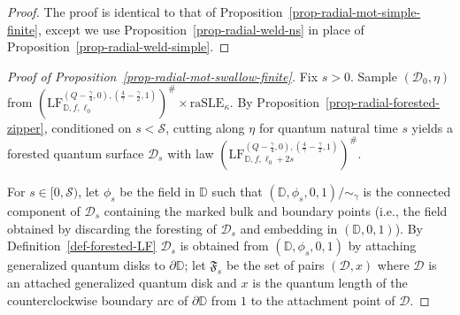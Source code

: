 \documentclass[a4paper]{article}
\numberwithin{equation}{section}
\newcommand{\bbD}{\mathbb{D}}
\newcommand{\D}{\mathbb{D}}
\newcommand{\cD}{\mathcal{D}}
\newcommand{\qduration}{\mathcal{S}}
\newcommand{\LF}{\mathrm{LF}}
\theoremstyle{remark}
\numberwithin{equation}{section}
\begin{document}
\begin{proof}
The proof is identical to that of Proposition~\ref{prop-radial-mot-simple-finite}, except we use Proposition~\ref{prop-radial-weld-ns} in place of Proposition~\ref{prop-radial-weld-simple}.  
\end{proof}

    
\begin{proof}[{Proof of Proposition~\ref{prop-radial-mot-swallow-finite}}]
Fix $s >0$. Sample $(\cD_0, \eta)$ from $ (\LF_{\bbD, f, \ell_0}^{(Q-\frac{\gamma}{4},0),(\frac4\gamma - \frac\gamma2,1)})^\#\times \mathrm{raSLE}_\kappa$.
By Proposition~\ref{prop-radial-forested-zipper}, conditioned on $s < \qduration$, cutting along $\eta$ for quantum natural time $s$ yields a forested quantum surface $\cD_s$ with law $(\LF_{\bbD, f, \ell_0+2s}^{(Q-\frac{\gamma}{4},0),(\frac4\gamma - \frac\gamma2,1)})^\#$.

For $s \in [0,\qduration)$, let $\phi_s$ be the field in $\D$ such that $(\D, \phi_s, 0, 1)/{\sim_\gamma}$ is the connected component of $\cD_s$ containing the marked bulk and boundary points (i.e., the field obtained by discarding the foresting of $\cD_s$ and embedding in $(\D, 0, 1)$). By Definition~\ref{def-forested-LF} $\cD_s$ is obtained from $(\D, \phi_s, 0, 1)$ by attaching generalized quantum disks to $\partial \D$; let $\mathfrak F_s$ be the set of pairs $(\cD, x)$ where $\cD$ is an attached generalized quantum disk and $x$ is the quantum length of the counterclockwise boundary arc of $\partial \D$ from $1$ to the attachment point of $\cD$. 


\end{proof}
\end{document}
